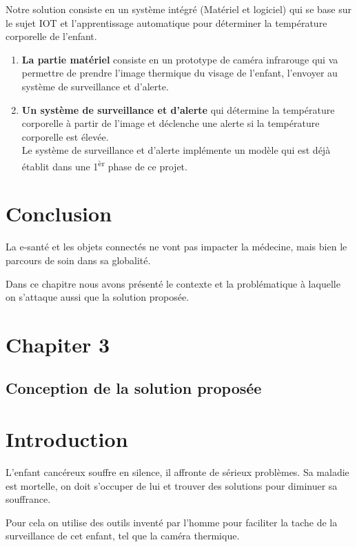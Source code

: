 \documentclass[12pt]{article}
\begin{document}
Notre solution consiste en un système intégré (Matériel et logiciel) qui se base sur le sujet IOT et l'apprentissage automatique pour déterminer la température corporelle de l'enfant.
\begin{enumerate}
	\item \textbf{La partie matériel} consiste en un prototype de caméra infrarouge qui va permettre de prendre l'image thermique du visage de l'enfant, l'envoyer au système de surveillance et  d'alerte.
	\item \textbf{Un système de surveillance et d'alerte} qui détermine la température corporelle à partir de l'image et déclenche une alerte si la température corporelle est élevée.\\
	Le système de surveillance et d'alerte implémente un modèle qui est déjà établit dans une 1\textsuperscript{èr} phase de ce projet.
\end{enumerate}

\section{Conclusion}
La e-santé et les objets connectés ne vont pas impacter  la médecine, mais bien le parcours de soin dans sa globalité.

Dans ce chapitre nous avons présenté le contexte et la problématique à laquelle on s'attaque aussi que la solution proposée.

\newpage
\rhead{}
\section*{\Huge{Chapiter 3}}
\subsection*{\huge{Conception de la solution proposée}}
\newpage
{}
\section{Introduction}
L'enfant cancéreux souffre en silence, il affronte de sérieux problèmes. Sa maladie est mortelle, on doit s’occuper de lui et trouver des solutions pour diminuer sa souffrance.

Pour cela on utilise des outils inventé par l'homme pour faciliter la tache de la surveillance de cet enfant, tel que la caméra thermique.
\end{document}
